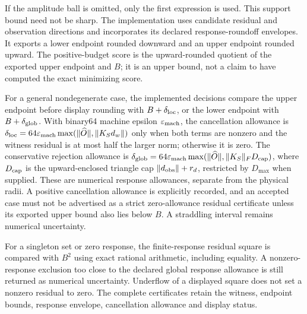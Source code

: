 If the amplitude ball is omitted, only the first expression is used.
This support bound need not be sharp. The implementation uses candidate
residual and observation directions and incorporates its declared
response-roundoff envelopes. It exports a lower endpoint rounded
downward and an upper endpoint rounded upward. The positive-budget score
is the upward-rounded quotient of the exported upper endpoint and \(B\);
it is an upper bound, not a claim to have computed the exact minimizing
score.

For a general nondegenerate case, the implemented decisions compare the
upper endpoint before display rounding with \(B+\delta_{\rm loc}\), or
the lower endpoint with \(B+\delta_{\rm glob}\). With binary64 machine
epsilon \(\varepsilon_{\rm mach}\), the cancellation allowance is
\(\delta_{\rm loc}=64\varepsilon_{\rm mach}\max(\|\widehat O\|,\|K_Sd_w\|)\)
only when both terms are nonzero and the witness residual is at most
half the larger norm; otherwise it is zero. The conservative rejection
allowance is
\(\delta_{\rm glob}=64\varepsilon_{\rm mach}\max(\|\widehat O\|,\|K_S\|_F D_{\rm cap})\),
where \(D_{\rm cap}\) is the upward-enclosed triangle cap
\(\|d_{\rm obs}\|+r_d\), restricted by \(D_{\max}\) when supplied. These
are numerical response allowances, separate from the physical radii. A
positive cancellation allowance is explicitly recorded, and an accepted
case must not be advertised as a strict zero-allowance residual
certificate unless its exported upper bound also lies below \(B\). A
straddling interval remains numerical uncertainty.

For a singleton set or zero response, the finite-response residual
square is compared with \(B^2\) using exact rational arithmetic,
including equality. A nonzero-response exclusion too close to the
declared global response allowance is still returned as numerical
uncertainty. Underflow of a displayed square does not set a nonzero
residual to zero. The complete certificates retain the witness, endpoint
bounds, response envelope, cancellation allowance and display status.


